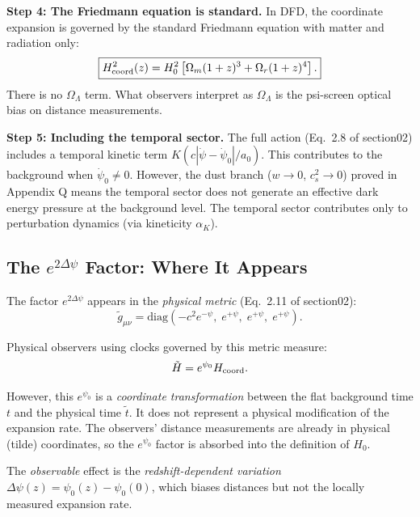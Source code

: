 \documentclass[11pt,a4paper]{article}
\newcounter{findingctr}
\newenvironment{finding}[1][]{%
  \refstepcounter{findingctr}%
  \begin{tcolorbox}[colback=blue!3!white, colframe=blue!50!black,
    title=\textbf{Finding \thefindingctr: #1}]
}{%
  \end{tcolorbox}%
}
\newcommand{\Omm}{\Omega_m}
\newcommand{\Dpsi}{\Delta\psi}
\begin{document}
\begin{finding}[\textbf{Nonlinear Friedmann}: DFD Has No Modified
  Background Equation]
\textbf{Step 4: The Friedmann equation is standard.}
In DFD, the coordinate expansion is governed by the standard Friedmann
equation with matter and radiation only:
\begin{equation}
\boxed{
H_{\rm coord}^2(z) = H_0^2\left[\Omm(1+z)^3 + \Omega_r(1+z)^4\right].
}
\label{eq:friedmann-dfd-correct}
\end{equation}
There is no $\Omega_\Lambda$ term.  What observers interpret as
$\Omega_\Lambda$ is the psi-screen optical bias on distance measurements.

\textbf{Step 5: Including the temporal sector.}
The full action (Eq.~2.8 of section02) includes a temporal kinetic
term $K(c|\dot\psi - \dot\psi_0|/a_0)$.  This contributes to the
background when $\dot\psi_0 \neq 0$.  However, the dust branch
($w \to 0$, $c_s^2 \to 0$) proved in Appendix Q means the temporal
sector does not generate an effective dark energy pressure at the
background level.  The temporal sector contributes only to perturbation
dynamics (via kineticity $\alpha_K$).

\subsection*{The $e^{2\Dpsi}$ Factor: Where It Appears}

The factor $e^{2\Dpsi}$ appears in the \emph{physical metric}
(Eq.~2.11 of section02):
\begin{equation}
\tilde{g}_{\mu\nu} = \text{diag}(-c^2 e^{-\psi},\; e^{+\psi},\;
e^{+\psi},\; e^{+\psi}).
\end{equation}

Physical observers using clocks governed by this metric measure:
\begin{equation}
\tilde{H} = e^{\psi_0} H_{\rm coord}.
\end{equation}

However, this $e^{\psi_0}$ is a \emph{coordinate transformation}
between the flat background time $t$ and the physical time
$\tilde{t}$.  It does not represent a physical modification of the
expansion rate.  The observers' distance measurements are already
in physical (tilde) coordinates, so the $e^{\psi_0}$ factor is
absorbed into the definition of $H_0$.

The \emph{observable} effect is the \emph{redshift-dependent
variation} $\Dpsi(z) = \psi_0(z) - \psi_0(0)$, which biases
distances but not the locally measured expansion rate.

\end{finding}
\end{document}
